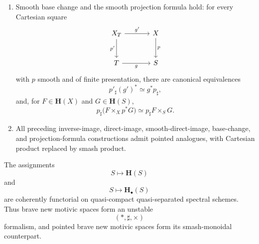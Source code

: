 \begin{theorem}
\begin{enumerate}[label=(\roman*)]
    \item Smooth base change and the smooth projection formula hold:
    for every Cartesian square
    \[
    \begin{tikzcd}[column sep=large, row sep=large]
        X_T
            \arrow[r, "g'"]
            \arrow[d, "p'"']
        &
        X
            \arrow[d, "p"]
        \\
        T
            \arrow[r, "g"']
        &
        S
    \end{tikzcd}
    \]
    with \(p\) smooth and of finite presentation, there are canonical
    equivalences
    \[
        p'_\sharp(g')^*
        \simeq
        g^*p_\sharp,
    \]
    and, for \(F\in\mathbf H(X)\) and \(G\in\mathbf H(S)\),
    \[
        p_\sharp
        \bigl(
            F\times_Xp^*G
        \bigr)
        \simeq
        p_\sharp F\times_SG.
    \]

    \item All preceding inverse-image, direct-image, smooth-direct-image,
    base-change, and projection-formula constructions admit pointed
    analogues, with Cartesian product replaced by smash product.
\end{enumerate}

The assignments
\[
    S
    \longmapsto
    \mathbf H(S)
\]
and
\[
    S
    \longmapsto
    \mathbf H_\bullet(S)
\]
are coherently functorial on quasi-compact quasi-separated spectral
schemes.  Thus brave new motivic spaces form an unstable
\[
    (*,\sharp,\times)
\]
formalism, and pointed brave new motivic spaces form its smash-monoidal
counterpart.
\end{theorem}

